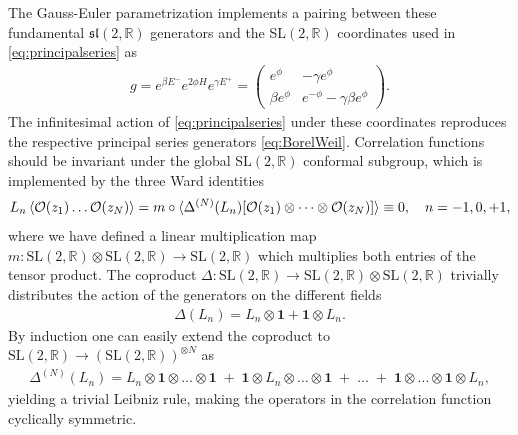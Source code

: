 \documentclass[a4paper,titlepage,12pt]{article}
\numberwithin{equation}{section}
\begin{document}
The Gauss-Euler parametrization implements a pairing between these fundamental $\mathfrak{sl}(2,\mathbb{R})$ generators and the SL$(2,\mathbb{R})$ coordinates used in \eqref{eq:principalseries} as 
\begin{align}
    g=e^{\beta E^-}e^{2\phi H }e^{\gamma E^+}=\begin{pmatrix}
        e^{\phi}&-\gamma e^\phi\\ \beta e^\phi&e^{-\phi}-\gamma\beta e^\phi
    \end{pmatrix}.
\end{align}
The infinitesimal action of \eqref{eq:principalseries} under these coordinates reproduces the respective principal series generators \eqref{eq:BorelWeil}. Correlation functions should be invariant under the global SL$(2,\mathbb{R})$ conformal subgroup, which is implemented by the three Ward identities 
\begin{align}
    L_n\braket{\mathcal{O}(z_1)\dots \mathcal{O}(z_N)}=m\circ\braket{\Delta^{(N)}(L_n)[\mathcal{O}(z_1)\otimes\dots \otimes\mathcal{O}(z_N)]}\equiv 0, \quad n=-1,0,+1,
\end{align}
where we have defined a linear multiplication map $m:\text{SL}(2,\mathbb{R})\otimes \text{SL}(2,\mathbb{R})\rightarrow \text{SL}(2,\mathbb{R})$ which multiplies both entries of the tensor product. The coproduct $\Delta:\text{SL}(2,\mathbb{R})\rightarrow \text{SL}(2,\mathbb{R})\otimes \text{SL}(2,\mathbb{R})$ trivially distributes the action of the generators on the different fields  
\begin{align}
    \Delta(L_n)=L_n\otimes \mathbf{1}+\mathbf{1}\otimes L_n.
\end{align}
By induction one can easily extend the coproduct to $\text{SL}(2,\mathbb{R})\rightarrow (\text{SL}(2,\mathbb{R}))^{\otimes N}$ as 
\begin{align}
\label{eq:copN}
    \Delta^{(N)}(L_n)=L_n\otimes \mathbf{1}\otimes \dots \otimes \mathbf{1}\;+\;\mathbf{1}\otimes L_n\otimes \dots \otimes \mathbf{1}\;+\;\dots\;+\;\mathbf{1}\otimes \dots \otimes \mathbf{1}\otimes L_n,
\end{align}
yielding a trivial Leibniz rule, making the operators in the correlation function cyclically symmetric. 
\end{document}
